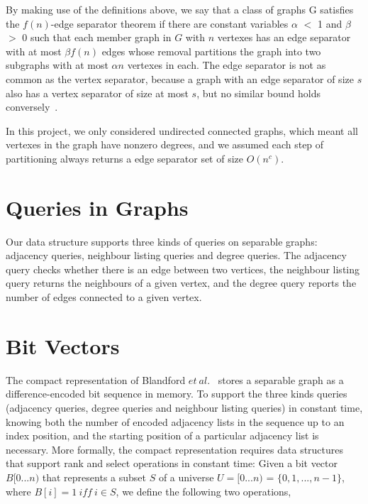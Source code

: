 \documentclass[12pt,glossary]{dalthesis}
\begin{document}
\bigskip
\bigskip

By making use of the definitions above, we say that a class of graphs G satisfies the $f(n)$-edge separator theorem if there are constant variables $\alpha$ $<$ 1 and $\beta$ $>$ 0 such that each member graph in $G$ with $n$ vertexes has an edge separator with at most $\beta f(n)$ edges whose removal partitions the graph into two subgraphs with at most $\alpha n$ vertexes in each. The edge separator is not as common as the vertex separator, because a graph with an edge separator of size $s$ also has a vertex separator of size at most $s$, but no similar bound holds conversely~\cite{compact-representation}.

\bigskip
\bigskip

In this project, we only considered undirected connected graphs, which meant all vertexes in the graph have nonzero degrees, and we assumed each step of partitioning always returns a edge separator set of size $O(n^{c})$.

\bigskip
\bigskip

\section{Queries in Graphs}
Our data structure supports three kinds of queries on separable graphs: adjacency queries, neighbour listing queries and degree queries. The adjacency query checks whether there is an edge between two vertices, the neighbour listing query returns the neighbours of a given vertex, and the degree query reports the number of edges connected to a given vertex.

\bigskip
\bigskip

\section{Bit Vectors}
The compact representation of Blandford $et \ al.$~\cite{compact-representation} stores a separable graph as a difference-encoded bit sequence in memory. To support the three kinds queries (adjacency queries, degree queries and neighbour listing queries) in constant time, knowing both the number of encoded adjacency lists in the sequence up to an index position, and the starting position of a particular adjacency list is necessary. More formally, the compact representation requires data structures that support rank and select operations in constant time: Given a bit vector $B[0...n)$ that represents a subset $S$ of a universe $U = [0...n)$ = $\{0,1,...,n-1 \}$, where $B[i] = 1 \ iff \ i \in S$, we define the following two operations, 
\end{document}
